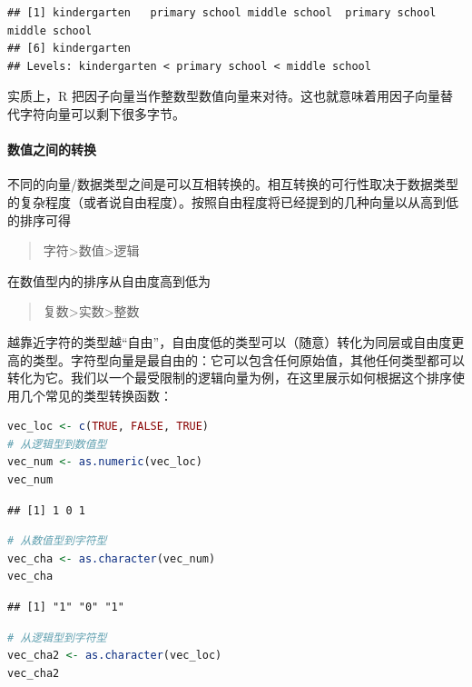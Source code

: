 \documentclass[]{ctexbook}
\let\oldparagraph\paragraph
\renewcommand{\paragraph}[1]{\oldparagraph{#1}\mbox{}}
\begin{document}
\begin{lstlisting}
## [1] kindergarten   primary school middle school  primary school middle school 
## [6] kindergarten  
## Levels: kindergarten < primary school < middle school
\end{lstlisting}

实质上，R 把因子向量当作整数型数值向量来对待。这也就意味着用因子向量替代字符向量可以剩下很多字节。

\hypertarget{transform}{%
\paragraph{数值之间的转换}\label{transform}}

不同的向量/数据类型之间是可以互相转换的。相互转换的可行性取决于数据类型的复杂程度（或者说自由程度）。按照自由程度将已经提到的几种向量以从高到低的排序可得

\begin{quote}
字符\textgreater 数值\textgreater 逻辑
\end{quote}

在数值型内的排序从自由度高到低为

\begin{quote}
复数\textgreater 实数\textgreater 整数
\end{quote}

越靠近字符的类型越``自由''，自由度低的类型可以（随意）转化为同层或自由度更高的类型。字符型向量是最自由的：它可以包含任何原始值，其他任何类型都可以转化为它。我们以一个最受限制的逻辑向量为例，在这里展示如何根据这个排序使用几个常见的类型转换函数：

\begin{lstlisting}[language=R]
vec_loc <- c(TRUE, FALSE, TRUE)
# 从逻辑型到数值型
vec_num <- as.numeric(vec_loc)
vec_num
\end{lstlisting}

\begin{lstlisting}
## [1] 1 0 1
\end{lstlisting}

\begin{lstlisting}[language=R]
# 从数值型到字符型
vec_cha <- as.character(vec_num)
vec_cha
\end{lstlisting}

\begin{lstlisting}
## [1] "1" "0" "1"
\end{lstlisting}

\begin{lstlisting}[language=R]
# 从逻辑型到字符型
vec_cha2 <- as.character(vec_loc)
vec_cha2
\end{lstlisting}
\end{document}
